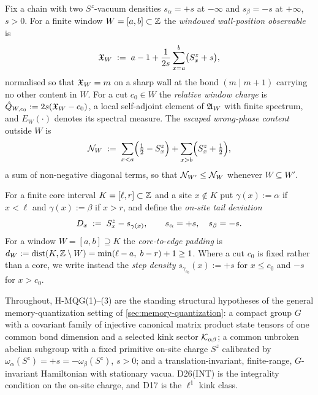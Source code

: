 \begin{definition}
\label{def:window-charge}
Fix a chain with two $S^z$-vacuum densities $s_\alpha=+s$ at $-\infty$ and
$s_\beta=-s$ at $+\infty$, $s>0$. For a finite window $W=[a,b]\subset\mathbb{Z}$ the
\emph{windowed wall-position observable} is
\begin{equation}
  \mathfrak{X}_W \;:=\; a-1+\frac{1}{2s}\sum_{x=a}^{b}\bigl(S^z_x+s\bigr),
  \label{eq:wall-observable}
\end{equation}
normalised so that $\mathfrak{X}_W=m$ on a sharp wall at the bond $(m\mid m+1)$
carrying no other content in $W$. For a cut $c_0\in W$ the \emph{relative
window charge} is $\hat{Q}_{W,c_0}:=2s(\mathfrak{X}_W-c_0)$, a local self-adjoint
element of $\mathfrak{A}_W$ with finite spectrum, and $E_W(\cdot)$ denotes its
spectral measure. The \emph{escaped wrong-phase content} outside $W$ is
\begin{equation}
  \mathcal{N}_W \;:=\; \sum_{x<a}\Bigl(\tfrac12-S^z_x\Bigr)
              +\sum_{x>b}\Bigl(S^z_x+\tfrac12\Bigr),
  \label{eq:escaped-content}
\end{equation}
a sum of non-negative diagonal terms, so that $\mathcal{N}_{W'}\le\mathcal{N}_W$ whenever
$W\subseteq W'$.
\end{definition}

\begin{definition}
\label{def:tail-deviations}
For a finite core interval $K=[\ell,r]\subset\mathbb{Z}$ and a site $x\notin K$ put
$\gamma(x):=\alpha$ if $x<\ell$ and $\gamma(x):=\beta$ if $x>r$, and define the
\emph{on-site tail deviation}
\begin{equation}
  D_x \;:=\; S^z_x-s_{\gamma(x)},\qquad s_\alpha=+s,\quad s_\beta=-s .
  \label{eq:tail-deviation}
\end{equation}
For a window $W=[a,b]\supseteq K$ the \emph{core-to-edge padding} is
$d_W:=\operatorname{dist}(K,\mathbb{Z}\setminus W)=\min(\ell-a,\;b-r)+1\ge1$. Where a cut $c_0$ is
fixed rather than a core, we write instead the \emph{step density}
$s_{\gamma_{c_0}}(x):=+s$ for $x\le c_0$ and $-s$ for $x>c_0$.
\end{definition}

Throughout, H-MQG(1)--(3) are the standing structural hypotheses of the
general memory-quantization setting of \cref{sec:memory-quantization}: a
compact group $G$ with a covariant family of injective canonical matrix
product state tensors of one common bond dimension and a selected kink sector
$\mathcal{K}_{\alpha\beta}$; a common unbroken abelian subgroup with a fixed primitive
on-site charge $S^z$ calibrated by $\omega_\alpha(S^z)=+s=-\omega_\beta(S^z)$,
$s>0$; and a translation-invariant, finite-range, $G$-invariant Hamiltonian
with stationary vacua. D26(INT) is the integrality condition on the on-site
charge, and D17 is the $\ell^1$ kink class.

